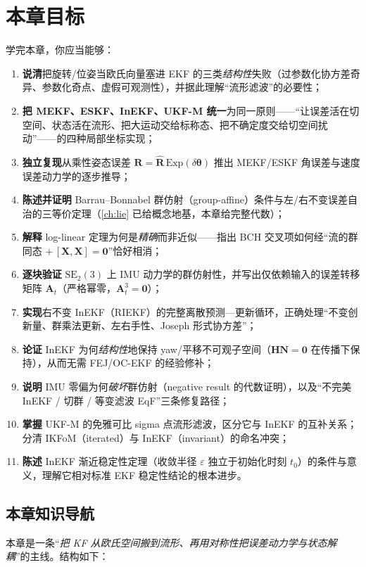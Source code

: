 \section*{本章目标}
学完本章，你应当能够：
\begin{enumerate}
  \item \textbf{说清}把旋转/位姿当欧氏向量塞进 EKF 的三类\emph{结构性}失败（过参数化协方差奇异、参数化奇点、虚假可观测性），并据此理解“流形滤波”的必要性；
  \item \textbf{把 MEKF、ESKF、InEKF、UKF-M 统一}为同一原则——“让误差活在切空间、状态活在流形、把大运动交给标称态、把不确定度交给切空间扰动”——的四种局部坐标实现；
  \item \textbf{独立复现}从乘性姿态误差 $\mathbf{R}=\hat{\mathbf{R}}\,\mathrm{Exp}(\delta\boldsymbol{\theta})$ 推出 MEKF/ESKF 角误差与速度误差动力学的逐步推导；
  \item \textbf{陈述并证明} Barrau--Bonnabel 群仿射（group-affine）条件与左/右不变误差自治的三等价定理（\cref{ch:lie} 已给概念地基，本章给完整代数）；
  \item \textbf{解释} log-linear 定理为何是\emph{精确}而非近似——指出 BCH 交叉项如何经“流的群同态 $+\,[\mathbf{X},\mathbf{X}]=\mathbf{0}$”恰好相消；
  \item \textbf{逐块验证} $\mathrm{SE}_2(3)$ 上 IMU 动力学的群仿射性，并写出仅依赖输入的误差转移矩阵 $\mathbf{A}_t$（严格幂零，$\mathbf{A}_t^3=\mathbf{0}$）；
  \item \textbf{实现}右不变 InEKF（RIEKF）的完整离散预测—更新循环，正确处理“不变创新量、群乘法更新、左右手性、Joseph 形式协方差”；
  \item \textbf{论证} InEKF 为何\emph{结构性}地保持 yaw/平移不可观子空间（$\mathbf{H}\mathbf{N}=\mathbf{0}$ 在传播下保持），从而无需 FEJ/OC-EKF 的经验修补；
  \item \textbf{说明} IMU 零偏为何\emph{破坏}群仿射（negative result 的代数证明），以及“不完美 InEKF / 切群 / 等变滤波 EqF”三条修复路径；
  \item \textbf{掌握} UKF-M 的免雅可比 sigma 点流形滤波，区分它与 InEKF 的互补关系；分清 IKFoM（iterated）与 InEKF（invariant）的命名冲突；
  \item \textbf{陈述} InEKF 渐近稳定性定理（收敛半径 $\varepsilon$ 独立于初始化时刻 $t_0$）的条件与意义，理解它相对标准 EKF 稳定性结论的根本进步。
\end{enumerate}

\subsection*{本章知识导航}
本章是一条“\emph{把 KF 从欧氏空间搬到流形、再用对称性把误差动力学与状态解耦}”的主线。结构如下：

